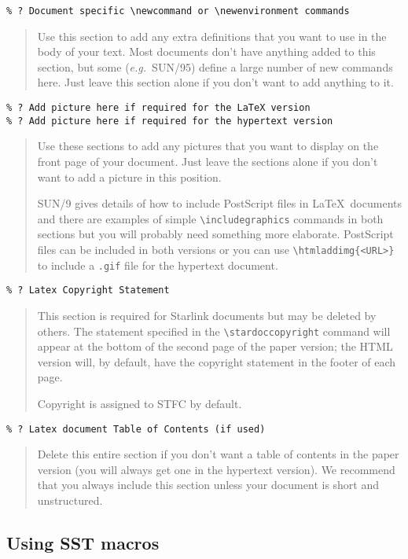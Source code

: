 \documentclass[twoside,11pt]{article}
\newcommand{\stardoccopyright} 
{Copyright \copyright\ 2000-2004 Council for the Central Laboratory of the Research Councils
<br>
Copyright \copyright\ 2008 Science and Technology Facilities Council}
\newcommand{\htmladdimg}[1]{}
\newcommand{\xref}[3]{#1}
\newcommand{\xlabel}[1]{}
\renewcommand{\_}{\texttt{\symbol{95}}}
\begin{document}
\verb+% ? Document specific \newcommand or \newenvironment commands+

\begin{quote}
Use this section to add any extra definitions that you want to use in the body
of your text.
Most documents don't have anything added to this section, but some
({\em{e.g.}}\ SUN/95) define a large number of new commands here.
Just leave this section alone if you don't want to add anything to it.
\end{quote}
\begin{verbatim}
% ? Add picture here if required for the LaTeX version
% ? Add picture here if required for the hypertext version
\end{verbatim}
\begin{quote}
Use these sections to add any pictures that you want to display on the front
page of your document.
Just leave the sections alone if you don't want to add a picture in this
position.

\xref{SUN/9}{sun9}{including_ps_in_latex}
gives details of how to include PostScript files in \LaTeX\ documents
and there are examples of simple \verb+\includegraphics+ commands in both
sections but you will probably need something more elaborate.
PostScript files can be included in both versions
or you can use \verb+\htmladdimg{<URL>}+ to include a \texttt{.gif} file for
the hypertext document.
\end{quote}

\verb+% ? Latex Copyright Statement+

\begin{quote}
This section is required for Starlink documents but may be deleted by others.
The statement specified in the \verb+\stardoccopyright+ command will appear at
the bottom of the second page of the paper version; the HTML version will, by
default, have the copyright statement in the footer of each page.

Copyright is assigned to STFC by default.
\end{quote}

\verb+% ? Latex document Table of Contents (if used)+

\begin{quote}
Delete this entire section if you don't want a table of contents in the paper
version (you will always get one in the hypertext version).
We recommend that you always include this section unless your document is short
and unstructured.
\end{quote}

\subsection{\xlabel{using_sst_macros}Using SST macros}
\end{document}
